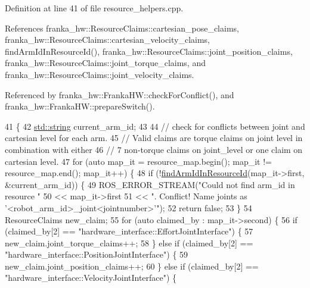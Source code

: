 Definition at line 41 of file resource\+\_\+helpers.\+cpp.



References franka\+\_\+hw\+::\+Resource\+Claims\+::cartesian\+\_\+pose\+\_\+claims, franka\+\_\+hw\+::\+Resource\+Claims\+::cartesian\+\_\+velocity\+\_\+claims, find\+Arm\+Id\+In\+Resource\+Id(), franka\+\_\+hw\+::\+Resource\+Claims\+::joint\+\_\+position\+\_\+claims, franka\+\_\+hw\+::\+Resource\+Claims\+::joint\+\_\+torque\+\_\+claims, and franka\+\_\+hw\+::\+Resource\+Claims\+::joint\+\_\+velocity\+\_\+claims.



Referenced by franka\+\_\+hw\+::\+Franka\+H\+W\+::check\+For\+Conflict(), and franka\+\_\+hw\+::\+Franka\+H\+W\+::prepare\+Switch().


\begin{DoxyCode}
41                                                                                          \{
42   \hyperlink{namespacetesting_1_1internal_a8e8ff5b11e64078831112677156cb111}{std::string} current\_arm\_id;
43 
44   \textcolor{comment}{// check for conflicts between joint and cartesian level for each arm.}
45   \textcolor{comment}{// Valid claims are torque claims on joint level in combination with either}
46   \textcolor{comment}{// 7 non-torque claims on joint\_level or one claim on cartesian level.}
47   \textcolor{keywordflow}{for} (\textcolor{keyword}{auto} map\_it = resource\_map.begin(); map\_it != resource\_map.end(); map\_it++) \{
48     \textcolor{keywordflow}{if} (!\hyperlink{namespacefranka__hw_aa86d54ddd446acb5a2101bfcc944b2c8}{findArmIdInResourceId}(map\_it->first, &current\_arm\_id)) \{
49       ROS\_ERROR\_STREAM(\textcolor{stringliteral}{"Could not find arm\_id in resource "}
50                        << map\_it->first
51                        << \textcolor{stringliteral}{". Conflict! Name joints as '<robot\_arm\_id>\_joint<jointnumber>'"});
52       \textcolor{keywordflow}{return} \textcolor{keyword}{false};
53     \}
54     ResourceClaims new\_claim;
55     \textcolor{keywordflow}{for} (\textcolor{keyword}{auto} claimed\_by : map\_it->second) \{
56       \textcolor{keywordflow}{if} (claimed\_by[2] == \textcolor{stringliteral}{"hardware\_interface::EffortJointInterface"}) \{
57         new\_claim.joint\_torque\_claims++;
58       \} \textcolor{keywordflow}{else} \textcolor{keywordflow}{if} (claimed\_by[2] == \textcolor{stringliteral}{"hardware\_interface::PositionJointInterface"}) \{
59         new\_claim.joint\_position\_claims++;
60       \} \textcolor{keywordflow}{else} \textcolor{keywordflow}{if} (claimed\_by[2] == \textcolor{stringliteral}{"hardware\_interface::VelocityJointInterface"}) \{

\end{DoxyCode}
